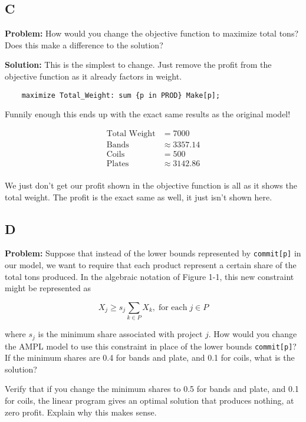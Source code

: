 \subsection*{C}

\textbf{Problem:} How would you change the objective function to maximize total tons? Does this make a difference to the solution?

\noindent\textbf{Solution:} This is the simplest to change. Just remove the profit from the objective function as it already factors in weight. 

\begin{lstlisting}
	maximize Total_Weight: sum {p in PROD} Make[p];
\end{lstlisting}

Funnily enough this ends up with the exact same results as the original model!

\begin{align*}
	\text{Total Weight} &= 7000 \\
	\text{Bands} &\approx 3357.14 \\
	\text{Coils} &= 500 \\
	\text{Plates} &\approx 3142.86 \\
\end{align*}

We just don't get our profit shown in the objective function is all as it shows the total weight. The profit is the exact same as well, it just isn't shown here.

\subsection*{D}

\textbf{Problem:} Suppose that instead of the lower bounds represented by \texttt{commit[p]} in our model, we want to require that each product represent a certain share of the total tons produced. In the algebraic notation of Figure 1-1, this new constraint might be represented as

\[
	X_j \geq s_j \sum_{k \in P} X_k, \; \text{for each} \; j \in P
\]

where $s_j$ is the minimum share associated with project $j$. How would you change the AMPL model to use this constraint in place of the lower bounds \texttt{commit[p]}? If the minimum shares are 0.4 for bands and plate, and 0.1 for coils, what is the solution?

Verify that if you change the minimum shares to 0.5 for bands and plate, and 0.1 for coils, the linear program gives an optimal solution that produces nothing, at zero profit. Explain why this makes sense.


